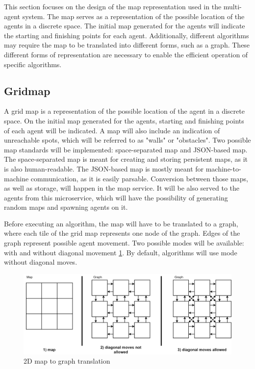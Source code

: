 This section focuses on the design of the map representation used in the multi-agent system. The map serves as a representation of the possible location of the agents in a discrete space. The initial map generated for the agents will indicate the starting and finishing points for each agent. Additionally, different algorithms may require the map to be translated into different forms, such as a graph. These different forms of representation are necessary to enable the efficient operation of specific algorithms. 

\subsection{Gridmap}
A grid map is a representation of the possible location of the agent in a discrete space. On the initial map generated for the agents, starting and finishing points of each agent will be indicated. A map will also include an indication of unreachable spots, which will be referred to as "walls" or "obstacles". Two possible map standards will be implemented: space-separated map and JSON-based map. The space-separated map is meant for creating and storing persistent maps, as it is also human-readable. The JSON-based map is mostly meant for machine-to-machine communication, as it is easily parsable. Conversion between those maps, as well as storage, will happen in the map service. It will be also served to the agents from this microservice, which will have the possibility of generating random maps and spawning agents on it.

Before executing an algorithm, the map will have to be translated to a graph, where each tile of the grid map represents one node of the graph. Edges of the graph represent possible agent movement. Two possible modes will be available: with and without diagonal movement \ref{fig:map_2D}. By default, algorithms will use mode without diagonal moves.

\begin{figure}[H]
    \centering
    \includegraphics[width=\textwidth]{pictures/map_2d.png}
    \caption{2D map to graph translation}
    \label{fig:map_2D}
\end{figure}


